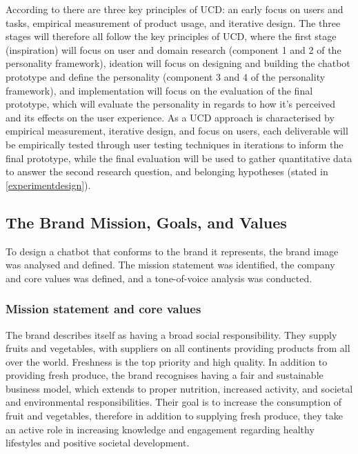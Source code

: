 According to \cite{Gould1985} there are three key principles of UCD: an early focus on users and tasks, empirical measurement of product usage, and iterative design. The three stages will therefore all follow the key principles of UCD, where the first stage (inspiration) will focus on user and domain research (component 1 and 2 of the personality framework), ideation will focus on designing and building the chatbot prototype and define the personality (component 3 and 4 of the personality framework), and implementation will focus on the evaluation of the final prototype, which will evaluate the personality in regards to how it's perceived and its effects on the user experience. As a UCD approach is characterised by empirical measurement, iterative design, and focus on users, each deliverable will be empirically tested through user testing techniques in iterations to inform the final prototype, while the final evaluation will be used to gather quantitative data to answer the second research question, and belonging hypotheses (stated in \ref{experimentdesign}).

\vspace{5mm} %

\subsection{The Brand Mission, Goals, and Values}

To design a chatbot that conforms to the brand it represents, the brand image was analysed and defined. The mission statement was identified, the company and core values was defined, and a tone-of-voice analysis was conducted.
    
\vspace{2,5mm}
    
        \subsubsection{Mission statement and core values}
 
        The brand describes itself as having a broad social responsibility. They supply fruits and vegetables, with suppliers on all continents providing products from all over the world. Freshness is the top priority and high quality. In addition to providing fresh produce, the brand recognises having a fair and sustainable business model, which extends to proper nutrition, increased activity, and societal and environmental responsibilities. Their goal is to increase the consumption of fruit and vegetables, therefore in addition to supplying fresh produce, they take an active role in increasing knowledge and engagement regarding healthy lifestyles and positive societal development.
 

